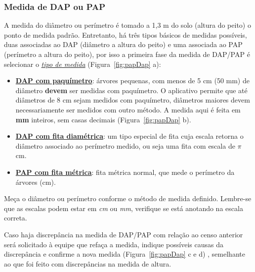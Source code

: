\documentclass[12pt, a4paper]{article} %
\begin{document}
\subsubsection{Medida de DAP ou PAP}
\label{sec:medida_de_dap_ou_pap}


A medida do diâmetro ou perímetro é tomado a 1,3 m do solo (altura do peito) o ponto de medida padrão. Entretanto, há três tipos básicos de medidas possíveis, duas associadas ao DAP (diâmetro a altura do peito) e uma associada ao PAP (perímetro a altura do peito), por isso a primeira fase da medida de DAP/PAP é selecionar o \textit{\underline{tipo de medida}} (Figura~\ref{fig:papDap} a):


\begin{itemize}
  \item \textbf{\underline{DAP com paquímetro}}: árvores pequenas, com menos de 5 cm (50 mm) de diâmetro \textbf{devem} ser medidas com paquímetro. O aplicativo permite que até diâmetros de 8 cm sejam medidos com paquímetro, diâmetros maiores devem necessariamente ser medidos com outro método. A medida aqui é feita em \textbf{mm} inteiros, sem casas decimais (Figura~\ref{fig:papDap} b).
\end{itemize}

\begin{itemize}
  \item \textbf{\underline{DAP com fita diamétrica}}: um tipo especial de fita cuja escala retorna o diâmetro associado ao perímetro medido, ou seja uma fita com escala de $\pi$ cm.  
\end{itemize}

\begin{itemize}
  \item \textbf{\underline{PAP com fita métrica}}: fita métrica normal, que mede o perímetro da árvores (cm).  
\end{itemize}




Meça o diâmetro ou perímetro conforme o método de medida definido. Lembre-se que as escalas podem estar em \emph{cm} ou \emph{mm}, verifique se está anotando na escala correta. 

Caso haja discrepância na medida de DAP/PAP com relação ao censo anterior será solicitado à equipe que refaça a medida, indique possíveis causas da discrepância e confirme a nova medida (Figura~\ref{fig:papDap} c e d) ,  semelhante ao que foi feito com discrepâncias na medida de altura.
\end{document}
